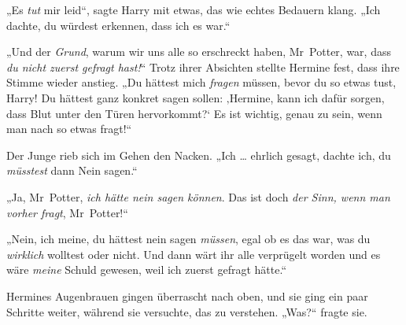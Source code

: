 „Es \emph{tut} mir leid“, sagte Harry mit etwas, das wie echtes Bedauern klang.
„Ich dachte, du würdest erkennen, dass ich es war.“

„Und der \emph{Grund}, warum wir uns alle so erschreckt haben, Mr~Potter, war, dass \emph{du nicht zuerst gefragt hast!}“ Trotz ihrer Absichten stellte Hermine fest, dass ihre Stimme wieder anstieg.
„Du hättest mich \emph{fragen} müssen, bevor du so etwas tust, Harry! Du hättest ganz konkret sagen sollen: ‚Hermine, kann ich dafür sorgen, dass Blut unter den Türen hervorkommt?‘ Es ist wichtig, genau zu sein, wenn man nach so etwas fragt!“

Der Junge rieb sich im Gehen den Nacken.
„Ich … ehrlich gesagt, dachte ich, du \emph{müsstest} dann Nein sagen.“

„Ja, Mr~Potter, \emph{ich hätte nein sagen können}. Das ist doch \emph{der Sinn, wenn man vorher fragt}, Mr~Potter!“

„Nein, ich meine, du hättest nein sagen \emph{müssen}, egal ob es das war, was du \emph{wirklich} wolltest oder nicht. Und dann wärt ihr alle verprügelt worden und es wäre \emph{meine} Schuld gewesen, weil ich zuerst gefragt hätte.“

Hermines Augenbrauen gingen überrascht nach oben, und sie ging ein paar Schritte weiter, während sie versuchte, das zu verstehen.
„Was?“ fragte sie.

